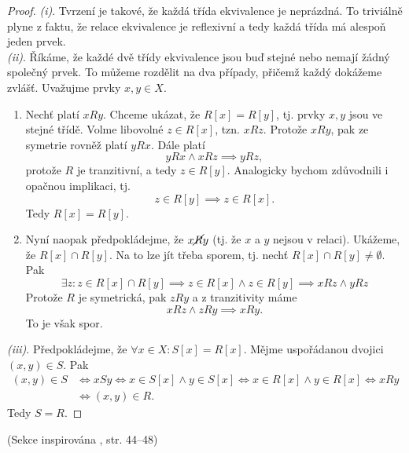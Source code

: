 \begin{proof}
    \textit{(i)}. Tvrzení je takové, že každá třída ekvivalence je neprázdná. To triviálně plyne z faktu, že relace ekvivalence je reflexivní a tedy každá třída má alespoň jeden prvek.\\
    \textit{(ii)}. Říkáme, že každé dvě třídy ekvivalence jsou buď stejné nebo nemají žádný společný prvek. To můžeme rozdělit na dva případy, přičemž každý dokážeme zvlášť. Uvažujme prvky $x,y\in X$.
    \begin{enumerate}[label=(\alph*)]
        \item Nechť platí $xRy$. Chceme ukázat, že $R[x]=R[y]$, tj. prvky $x,y$ jsou ve stejné třídě. Volme libovolné $z\in R[x]$, tzn. $xRz$. Protože $xRy$, pak ze symetrie rovněž platí $yRx$. Dále platí
        \begin{equation*}
            yRx \land xRz \implies yRz,
        \end{equation*}
        protože $R$ je tranzitivní, a tedy $z\in R[y]$. Analogicky bychom zdůvodnili i opačnou implikaci, tj.
        \begin{equation*}
            z\in R[y] \implies z\in R[x].
        \end{equation*}
        Tedy $R[x]=R[y]$.
        \item Nyní naopak předpokládejme, že $x\cancel{R}y$ (tj. že $x$ a $y$ nejsou v relaci). Ukážeme, že $R[x]\cap R[y]$. Na to lze jít třeba sporem, tj. nechť $R[x]\cap R[y]\neq\emptyset$. Pak
        \begin{equation*}
            \exists z: z\in R[x]\cap R[y] \implies z\in R[x] \land z\in R[y] \implies xRz \land yRz
        \end{equation*}
        Protože $R$ je symetrická, pak $zRy$ a z tranzitivity máme
        \begin{equation*}
            xRz \land zRy \implies xRy.
        \end{equation*}
        To je však spor.
    \end{enumerate}
    \textit{(iii)}. Předpokládejme, že $\forall x\in X: S[x]=R[x]$. Mějme uspořádanou dvojici $(x,y)\in S$. Pak
    \begin{align*}
        (x,y)\in S &\iff xSy \iff x\in S[x] \land y\in S[x] \iff x\in R[x] \land y\in R[x] \iff xRy\\
        &\iff (x,y)\in R.
    \end{align*}
    Tedy $S=R$.
\end{proof}
(Sekce inspirována \cite{MatousekNesetril2009}, str. 44--48)